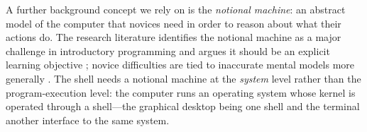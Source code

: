 A further background concept we rely on is the \emph{notional machine}: an
abstract model of the computer that novices need in order to reason about
what their actions do.
The research literature identifies the notional machine as a major challenge
in introductory programming and argues it should be an explicit learning
objective \autocite{Sorva2013NotionalMachines,DuBoulay1981BlackBox}; novice
difficulties are tied to inaccurate mental models more generally
\autocite{QianLehman2017Misconceptions,BenAri1998Constructivism}.
The shell needs a notional machine at the \emph{system} level rather than
the program-execution level: the computer runs an operating system whose
kernel is operated through a shell---the graphical desktop being one shell
and the terminal another interface to the same system.
